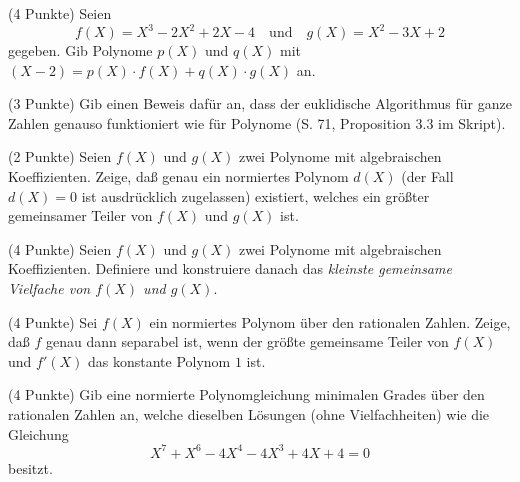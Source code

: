 \documentclass{algsheet}
\author{Dipl.-Math.~Franz Vogler}
\date{30.~November 2010}
\begin{document}
                \maketitle




\begin{exercise}(4 Punkte)\newline
    Seien
    \[
        f(X)  = X^3 - 2 X^2 + 2 X - 4\quad
        \text{und}\quad
     	g(X)  = X^2 - 3 X + 2 
    \]
    gegeben. Gib Polynome \(p(X)\) und \(q(X)\) mit
    \((X - 2) = p(X) \cdot f(X) + q(X) \cdot g(X)\) an.
\end{exercise}

\begin{exercise}(3 Punkte)\newline
    Gib einen Beweis dafür an, dass der euklidische Algorithmus für ganze Zahlen genauso funktioniert wie für Polynome (S. 71, Proposition 3.3 im Skript).
\end{exercise}

\begin{exercise}(2 Punkte)\newline
    Seien \(f(X)\) und \(g(X)\) zwei Polynome mit algebraischen Koeffizienten.
    Zeige, daß genau ein normiertes Polynom \(d(X)\) (der Fall \(d(X) = 0\)
    ist ausdrücklich zugelassen) existiert,
    welches ein größter gemeinsamer Teiler von
    \(f(X)\) und \(g(X)\) ist. 
\end{exercise}

\begin{exercise}(4 Punkte)\newline
    Seien \(f(X)\) und \(g(X)\) zwei Polynome mit algebraischen Koeffizienten.
    Definiere und konstruiere danach das \emph{kleinste gemeinsame Vielfache
    von \(f(X)\) und \(g(X)\)}.
\end{exercise}

\begin{exercise}(4 Punkte)\newline
    Sei \(f(X)\) ein normiertes Polynom über den rationalen Zahlen. Zeige, daß \(f\)
    genau dann separabel ist, wenn der größte
    gemeinsame Teiler von \(f(X)\) und \(f'(X)\) das konstante Polynom \(1\) ist.
\end{exercise}

\begin{exercise}(4 Punkte)\newline
    Gib eine normierte Polynomgleichung minimalen Grades über den rationalen
    Zahlen an, welche dieselben Lösungen
    (ohne Vielfachheiten) wie die Gleichung
   \[
        X^7 + X^6 - 4 X^4 - 4 X^3 + 4 X + 4 = 0
    \]
    besitzt.
\end{exercise}
\end{document}

